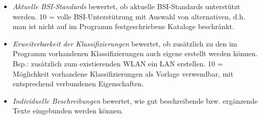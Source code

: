 \begin{itemize}
	\item \textit{Aktuelle BSI-Standards} bewertet, ob aktuelle BSI-Standards unterstützt werden. 10 = volle BSI-Unterstützung mit Auswahl von alternativen, d.h. man ist nicht auf im Programm festgeschriebene Kataloge beschränkt.

	\item \textit{Erweiterbarkeit der Klassifizierungen} bewertet, ob zusätzlich zu den im Programm vorhandenen Klassifizierungen auch eigene erstellt werden können. Bsp.: zusätzlich zum existierenden WLAN ein LAN erstellen. 10 = Möglichkeit vorhandene Klassifizierungen als Vorlage verwendbar, mit entsprechend verbundenen Eigenschaften.

	\item \textit{Individuelle Beschreibungen} bewertet, wie gut beschreibende bzw. ergänzende Texte eingebunden werden können.


\end{itemize}
